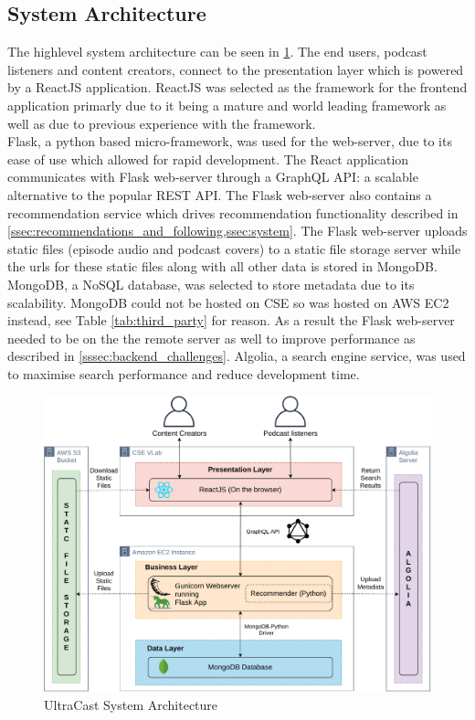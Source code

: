 \documentclass[../report.tex]{subfiles}
\begin{document}
\newpage

\subsection{System Architecture}

The highlevel system architecture can be seen in \cref{fig:system_architecture}.
The end users, podcast listeners and content creators, connect to the presentation layer 
which is powered by a ReactJS application. ReactJS was selected as the framework for the 
frontend application primarly due to it being a mature and world leading framework\cite{react} as well
as due to previous experience with the framework.\\

Flask, a python based micro-framework\cite{flask}, was used for the web-server, due to its ease of use which allowed
for rapid development. The React application communicates with Flask web-server through a GraphQL API: 
a scalable alternative to the popular REST API\cite{graphql}. The Flask web-server also contains a
recommendation service which drives recommendation functionality described in 
\cref{ssec:recommendations_and_following,ssec:system}. The Flask web-server uploads static files 
(episode audio and podcast covers) to a static file storage server while
the urls for these static files along with all other data is stored in MongoDB. MongoDB, a NoSQL database, 
was selected to store metadata due to its scalability\cite{MongoDB2020}. MongoDB could not be hosted on
CSE so was hosted on AWS EC2 instead, see Table \ref{tab:third_party} for reason. As a result the Flask web-server
needed to be on the the remote server as well to improve performance as described in \ref{sssec:backend_challenges}.
Algolia, a search engine service\cite{algolia}, was used to maximise search performance and reduce development time.

\begin{figure}[ht] 
    \centering
    \includegraphics[width=16cm]{resources/SystemArchitecture}
    \caption{UltraCast System Architecture}
    \label{fig:system_architecture} 
\end{figure}
\end{document}
